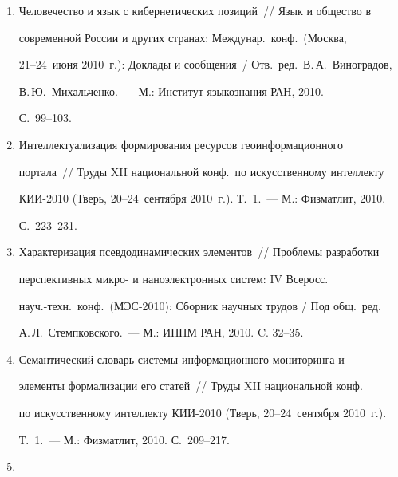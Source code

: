 \begin{enumerate}[1.]
Прогресс Человечества и Россия~/\!\!/  Россия в мире: гуманитарное, 


политическое и экономическое измерение: Мат-лы Всеросс.\ конф.\ (Москва, 


19~марта 2010~г.).~--- М.: Научный эксперт, 2010. С.~186--195.


\item {}


Человечество и язык с кибернетических позиций~/\!\!/  Язык и общество в 


современной России и других странах: Междунар.\ конф.\ (Москва, 


21--24~июня 2010~г.): Доклады и сообщения~/ Отв.\ ред.\ В.\,А.~Виноградов, 


В.\,Ю.~Михальченко.~--- М.: Институт языкознания РАН, 2010. 


С.~99--103.


\item {}


Интеллектуализация формирования ресурсов геоинформационного 


портала~/\!\!/  Труды XII национальной конф.\ по искусственному интеллекту 


КИИ-2010 (Тверь, 20--24~сентября 2010~г.). Т.~1.~--- М.: Физматлит, 2010. 


С.~223--231.


\item {}


Характеризация псевдодинамических элементов~/\!\!/  Проблемы разработки 


перспективных микро- и наноэлектронных сис\-тем: IV Всеросс.\ 


науч.-техн.\ конф.\ (МЭС-2010): Сборник научных трудов / Под общ.\ ред.\ 


А.\,Л.~Стемпковского.~--- М.: ИППМ РАН, 2010. C. 32--35.


\item {}


Семантический словарь сис\-темы информационного мониторинга и 


элементы формализации его статей~/\!\!/  Труды XII национальной конф.\ 


по искусственному интеллекту КИИ-2010 (Тверь, 20--24~сентября 2010~г.). 


Т.~1.~--- М.: Физматлит, 2010. С.~209--217.


\item {}



\end{enumerate}
